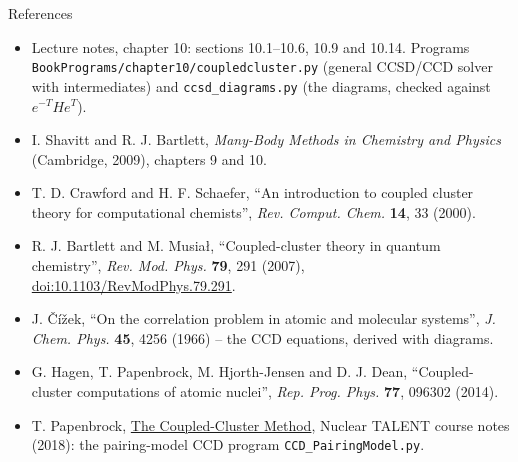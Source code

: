 \documentclass[aspectratio=169,10pt]{beamer}
\begin{document}
\begin{frame}{References}
\small
\begin{itemize}
\item Lecture notes, chapter 10: sections 10.1--10.6, 10.9 and 10.14. Programs \texttt{BookPrograms/chapter10/coupledcluster.py} (general CCSD/CCD solver with intermediates) and \texttt{ccsd\_diagrams.py} (the diagrams, checked against $e^{-T}He^{T}$).
\item I. Shavitt and R. J. Bartlett, \emph{Many-Body Methods in Chemistry and Physics} (Cambridge, 2009), chapters 9 and 10.
\item T. D. Crawford and H. F. Schaefer, ``An introduction to coupled cluster theory for computational chemists'', \emph{Rev. Comput. Chem.} \textbf{14}, 33 (2000).
\item R. J. Bartlett and M. Musia\l{}, ``Coupled-cluster theory in quantum chemistry'', \emph{Rev. Mod. Phys.} \textbf{79}, 291 (2007), \href{https://doi.org/10.1103/RevModPhys.79.291}{doi:10.1103/RevModPhys.79.291}.
\item J. \v{C}\'i\v{z}ek, ``On the correlation problem in atomic and molecular systems'', \emph{J. Chem. Phys.} \textbf{45}, 4256 (1966) -- the CCD equations, derived with diagrams.
\item G. Hagen, T. Papenbrock, M. Hjorth-Jensen and D. J. Dean, ``Coupled-cluster computations of atomic nuclei'', \emph{Rep. Prog. Phys.} \textbf{77}, 096302 (2014).
\item T. Papenbrock, \href{https://nucleartalent.github.io/ManyBody2018/doc/pub/CCM/html/CCM.html}{The Coupled-Cluster Method}, Nuclear TALENT course notes (2018): the pairing-model CCD program \texttt{CCD\_PairingModel.py}.
\end{itemize}
\end{frame}
\end{document}
